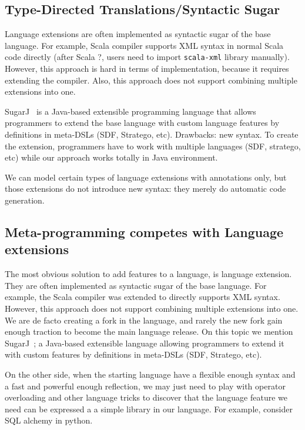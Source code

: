 \subsection{Type-Directed Translations/Syntactic Sugar}
Language extensions are often implemented as syntactic sugar of the base
language. For example, Scala compiler supports XML syntax in normal Scala code
directly (after Scala ?, users need to import \texttt{scala-xml} library
manually). However, this approach is hard in terms of implementation, because it
requires extending the compiler. Also, this approach does not support combining
multiple extensions into one.

SugarJ~\cite{erdweg11sugarj} is a Java-based extensible programming language
that allows programmers to extend the base language with custom language
features by definitions in meta-DSLs (SDF, Stratego, etc). 
  Drawbacks: new
syntax. To create the extension, programmers have to work with multiple
languages (SDF, stratego, etc) while our approach works totally in Java
environment.

We can model certain types of language extensions with annotations 
only, but those extensions do not introduce new syntax: they 
merely do automatic code generation. 

\subsection{Meta-programming competes with Language extensions}
The most obvious solution to add features to a language, is language extension.
They are often implemented as syntactic sugar of the base
language. For example, the Scala compiler was extended to directly supports XML syntax. However, this approach does not support combining multiple extensions into one. We are de facto creating a fork in the language, and rarely the new fork gain enough traction to become the main language release.
On this topic we mention SugarJ~\cite{erdweg11sugarj}; a Java-based extensible language allowing programmers to extend it with custom features by definitions in meta-DSLs (SDF, Stratego, etc). 

On the other side, when the starting language have a flexible enough syntax and a fast and powerful enough reflection, we may just need to play with operator overloading and other language tricks to discover that the language feature we need can be expressed a a simple library in our language. For example, consider SQL alchemy in python.

